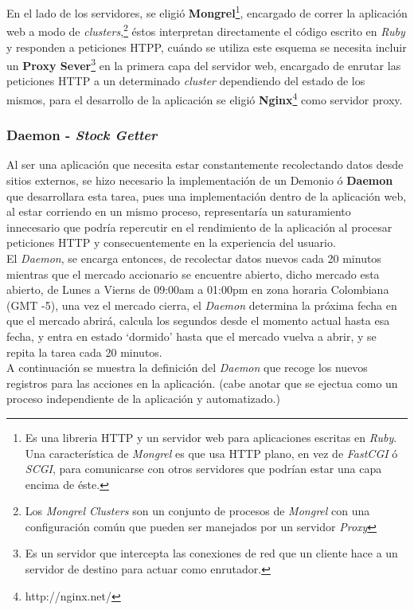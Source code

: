 \documentclass[twocolumn]{article}
\begin{document}
En el lado de los servidores, se eligió \textbf{Mongrel}\footnote{Es una libreria HTTP y un servidor web para aplicaciones escritas en \emph{Ruby}. Una característica de \emph{Mongrel} es que usa HTTP plano, en vez de \emph{FastCGI} ó \emph{SCGI}, para comunicarse con otros servidores que podrían estar una capa encima de éste.}, encargado de correr la aplicación web a modo de \emph{clusters},\footnote{Los \emph{Mongrel Clusters} son un conjunto de procesos de \emph{Mongrel} con una configuración común que pueden ser manejados por un servidor \emph{Proxy}} éstos interpretan directamente el código escrito en \emph{Ruby} y responden a peticiones HTPP, cuándo se utiliza este esquema se necesita incluir un \textbf{Proxy Sever}\footnote{Es un servidor que intercepta las conexiones de red que un cliente hace a un servidor de destino para actuar como enrutador.} en la primera capa del servidor web, encargado de enrutar las peticiones HTTP a un determinado \emph{cluster} dependiendo del estado de los mismos, para el desarrollo de la aplicación se eligió \textbf{Nginx}\footnote{http://nginx.net/} como servidor proxy.\\

\subsubsection{Daemon - \emph{Stock Getter}}

Al ser una aplicación que necesita estar constantemente recolectando datos desde sitios externos, se hizo necesario la implementación de un Demonio ó \textbf{Daemon} que desarrollara esta tarea, pues una implementación dentro de la aplicación web, al estar corriendo en un mismo proceso, representaría un saturamiento innecesario que podría repercutir en el rendimiento de la aplicación al procesar peticiones HTTP y consecuentemente en la experiencia del usuario.\\

El \emph{Daemon}, se encarga entonces, de recolectar datos nuevos cada 20 minutos mientras que el mercado accionario se encuentre abierto, dicho mercado esta abierto, de Lunes a Vierns de 09:00am a 01:00pm en zona horaria Colombiana (GMT -5), una vez el mercado cierra, el \emph{Daemon} determina la próxima fecha en que el mercado abrirá, calcula los segundos desde el momento actual hasta esa fecha, y entra en estado `dormido' hasta que el mercado vuelva a abrir, y se repita la tarea cada 20 minutos.\\

A continuación se muestra la definición del \emph{Daemon} que recoge los nuevos registros para las acciones en la aplicación. (cabe anotar que se ejectua como un proceso independiente de la aplicación y automatizado.)
\end{document}
